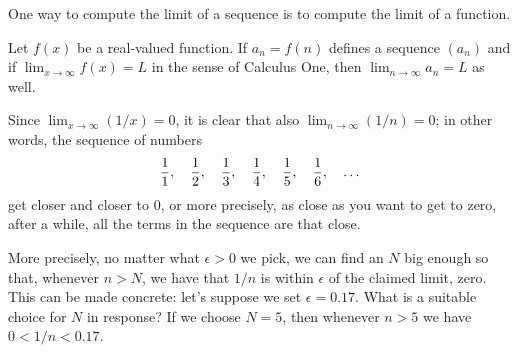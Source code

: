 \documentclass{ximera}
\begin{document}

One way to compute the limit of a sequence is to compute the limit of
a function.
\begin{theorem}
  \label{theorem:compute-limit-of-sequence-via-function}
  Let $f(x)$ be a real-valued function.  If $a_n = f(n)$ defines a
  sequence $(a_n)$ and if $\displaystyle\lim_{x\to\infty}f(x)=L$ in the sense of Calculus
  One, then $\displaystyle\lim_{n\to\infty} a_n=L$ as well.
\end{theorem}

\begin{example}
\label{example:find-n-for-epsilon}
Since $\displaystyle\lim_{x\to\infty}(1/x)=0$, it is
clear that also $\displaystyle\lim_{n\to\infty}(1/n)=0$; in other words, the sequence of numbers
$${1\over1},\quad {1\over2},\quad {1\over3},\quad {1\over4},\quad {1\over5},\quad {1\over6},\quad \ldots$$
get closer and closer to 0, or more precisely, as close as you want to get to zero, after a while, all the terms in the sequence are that close.

More precisely, no matter what $\epsilon > 0$ we pick, we can find an
$N$ big enough so that, whenever $n > N$, we have that $1/n$ is within
$\epsilon$ of the claimed limit, zero.  This can be made concrete:
let's suppose we set $\epsilon = 0.17$.  What is a suitable choice for
$N$ in response?  If we choose $N = 5$, then whenever $n > 5$ we have
$0 < 1/n < 0.17$.
\end{example}

\end{document}
